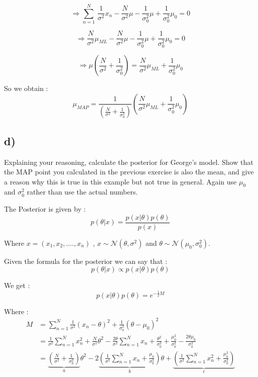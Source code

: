\documentclass[12pt,twoside]{article}
\begin{document}
\begin{equation*}
\Longrightarrow \sum_{n=1}^{N}  \, \frac{1}{\sigma^2} x_n - \frac{N}{\sigma^2} \mu  -\frac{1}{\sigma_0^2}\mu + \frac{1}{\sigma_0^2} \mu_0 = 0
\end{equation*}

\begin{equation*}
\Longrightarrow \frac{N}{\sigma^2} \mu_{ML} - \frac{N}{\sigma^2} \mu  -\frac{1}{\sigma_0^2}\mu + \frac{1}{\sigma_0^2} \mu_0 = 0
\end{equation*}

\begin{equation*}
\Longrightarrow \mu \left(\frac{N}{\sigma^2} + \frac{1}{\sigma_0^2} \right) = \frac{N}{\sigma^2} \mu_{ML} + \frac{1}{\sigma_0^2} \mu_0
\end{equation*}

So we obtain :
\begin{equation}
\boxed{ \mu_{MAP} = \frac{1}{\left(\frac{N}{\sigma^2} + \frac{1}{\sigma_0^2} \right)} \left( \frac{N}{\sigma^2} \mu_{ML} + \frac{1}{\sigma_0^2} \mu_0 \right) }
\end{equation}

\subsection*{d)} Explaining your reasoning, calculate the posterior for George’s model. Show that the MAP point you calculated in the previous exercise is also the mean, and give a reason why this is true in this example but not true in general. Again use $\mu_0$ and $\sigma_0^2$ rather than use the actual numbers.

The Posterior is given by :
\begin{equation*}
p(\theta|x) = \frac{p(x|\theta)p(\theta)}{p(x)}
\end{equation*}

Where $x =(x_1,x_2,....,x_n)$ , $x \sim \mathcal{N}(\theta, \sigma^2)$ and $\theta \sim \mathcal{N}(\mu_0, \sigma^2_0)$.

Given the formula for the posterior we can say that : 
\begin{equation*}
p(\theta|x) \propto p(x|\theta)p(\theta)
\end{equation*}

We get :
\begin{equation*}
p(x|\theta)p(\theta) = e^{-\frac{1}{2}M}
\end{equation*}

Where :
\begin{align*}
M &= \sum_{n=1}^{N} \frac{1}{\sigma^2}(x_n - \theta)^2 + \frac{1}{\sigma^2_0}(\theta - \mu_0)^2 \\
  &= \frac{1}{\sigma^2} \sum_{n=1}^{N}x_n^2 + \frac{N}{\sigma^2} \theta^2 - \frac{2\theta}{\sigma^2}\sum_{n=1}^{N}x_n + \frac{\theta^2}{\sigma_0^2} + \frac{\mu_0^2}{\sigma_0^2} - \frac{2\theta\mu_0}{\sigma_0^2}\\
  &= \underbrace{ \left(\frac{N}{\sigma^2} + \frac{1}{\sigma_0^2}\right)}_a\theta^2 - 2\underbrace{ \left(\frac{1}{\sigma^2}\sum_{n=1}^{N}x_n + \frac{\mu_0}{\sigma_0^2} \right)}_b\theta + \underbrace{\left(\frac{1}{\sigma^2} \sum_{n=1}^{N}x_n^2 + \frac{\mu_0^2}{\sigma_0^2} \right)}_c
\end{align*}
\end{document}
